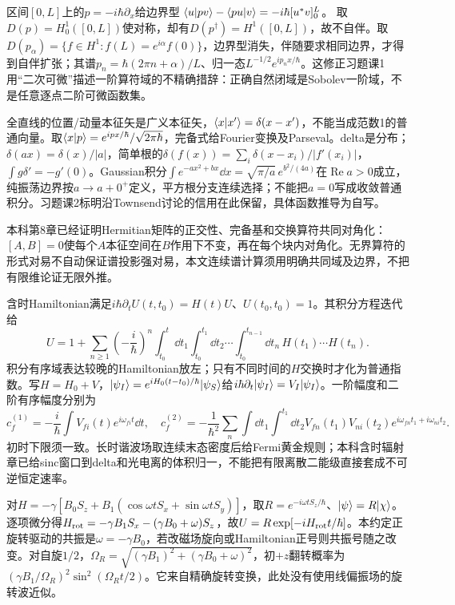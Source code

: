区间$[0,L]$上的$p=-i\hbar\partial_x$给边界型
$\langle u\vert pv\rangle-\langle pu\vert v\rangle=-i\hbar[u^*v]_0^L$。
取$D(p)=H^1_0([0,L])$使对称，却有$D(p^\dagger)=H^1([0,L])$，故不自伴。取$D(p_\alpha)=\{f\in H^1:f(L)=e^{i\alpha}f(0)\}$，边界型消失，伴随要求相同边界，才得到自伴扩张；其谱$p_n=\hbar(2\pi n+\alpha)/L$、归一态$L^{-1/2}e^{ip_nx/\hbar}$。这修正习题课1用“二次可微”描述一阶算符域的不精确措辞：正确自然闭域是Sobolev一阶域，不是任意逐点二阶可微函数集。

全直线的位置/动量本征矢是广义本征矢，$\langle x\vert x'\rangle=\delta(x-x')$，不能当成范数1的普通向量。取$\langle x\vert p\rangle=e^{ipx/\hbar}/\sqrt{2\pi\hbar}$，完备式给Fourier变换及Parseval。delta是分布；$\delta(ax)=\delta(x)/|a|$，简单根的$\delta(f(x))=\sum_i\delta(x-x_i)/|f'(x_i)|$，$\int g\delta'=-g'(0)$。Gaussian积分$\int e^{-ax^2+bx}\dd x=\sqrt{\pi/a}\,e^{b^2/(4a)}$在$\operatorname{Re}a>0$成立，纯振荡边界按$a\to a+0^+$定义，平方根分支连续选择；不能把$a=0$写成收敛普通积分。习题课2标明沿Townsend讨论的信用在此保留，具体函数推导为自写。

本科第8章已经证明Hermitian矩阵的正交性、完备基和交换算符共同对角化：$[A,B]=0$使每个$A$本征空间在$B$作用下不变，再在每个块内对角化。无界算符的形式对易不自动保证谱投影强对易，本文连续谱计算须用明确共同域及边界，不把有限维论证无限外推。

含时Hamiltonian满足$i\hbar\partial_tU(t,t_0)=H(t)U$、$U(t_0,t_0)=1$。其积分方程迭代给
\[
 U=1+\sum_{n\ge1}\left(-\frac i\hbar\right)^n
 \int_{t_0}^t\dd t_1\int_{t_0}^{t_1}\dd t_2\cdots
 \int_{t_0}^{t_{n-1}}\dd t_n\,H(t_1)\cdots H(t_n).
\]
积分有序域表达较晚的Hamiltonian放左；只有不同时间的$H$交换时才化为普通指数。写$H=H_0+V$，$\lvert \psi_I\rangle=e^{iH_0(t-t_0)/\hbar}\lvert \psi_S\rangle$给$i\hbar\partial_t\lvert \psi_I\rangle=V_I\lvert \psi_I\rangle$。一阶幅度和二阶有序幅度分别为
\[
 c_f^{(1)}=-\frac i\hbar\int V_{fi}(t)e^{i\omega_{fi}t}\dd t,
 \quad c_f^{(2)}=-\frac1{\hbar^2}\sum_n\int\dd t_1\int^{t_1}\dd t_2
 V_{fn}(t_1)V_{ni}(t_2)e^{i\omega_{fn}t_1+i\omega_{ni}t_2}.
\]
初时下限须一致。长时谐波场取连续末态密度后给Fermi黄金规则；本科含时辐射章已给sinc窗口到delta和光电离的体积归一，不能把有限离散二能级直接套成不可逆恒定速率。

对$H=-\gamma[B_0S_z+B_1(\cos\omega tS_x+\sin\omega tS_y)]$，取$R=e^{-i\omega tS_z/\hbar}$、$\lvert \psi\rangle=R\lvert \chi\rangle$。逐项微分得$H_{\rm rot}=-\gamma B_1S_x-(\gamma B_0+\omega)S_z$，故$U=R\exp[-iH_{\rm rot}t/\hbar]$。本约定正旋转驱动的共振是$\omega=-\gamma B_0$，若改磁场旋向或Hamiltonian正号则共振号随之改变。对自旋$1/2$，$\Omega_R=\sqrt{(\gamma B_1)^2+(\gamma B_0+\omega)^2}$，初$+z$翻转概率为$(\gamma B_1/\Omega_R)^2\sin^2(\Omega_Rt/2)$。它来自精确旋转变换，此处没有使用线偏振场的旋转波近似。

